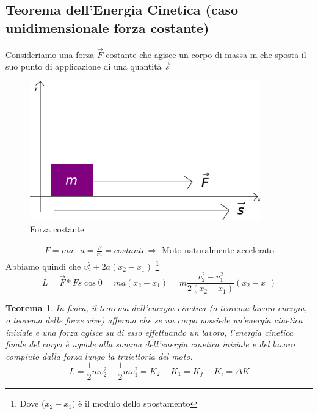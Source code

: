 \documentclass{book}
\newtheorem{teo}{Teorema}
\begin{document}
\subsection{Teorema dell’Energia Cinetica (caso unidimensionale forza costante)}
Consideriamo una forza $\vec{F}$ costante che agisce un corpo di massa m che sposta il suo punto di
applicazione di una quantità $\vec{s}$
\begin{figure}[th]
    \centering
    \includegraphics[width=10cm]{img/finiti/forza_costante.eps}
    \caption{Forza costante}
\end{figure}
\begin{equation}
  \begin{matrix}
    F=ma & a=\frac{F}{m}=costante \Rightarrow \text{ Moto naturalmente accelerato}
  \end{matrix}
\end{equation}
Abbiamo quindi che $v_2^2+2a(x_2-x_1)$ \footnote{Dove ($x_2-x_1$) è il modulo dello spostamento}
\begin{equation}
  L=\vec{F} * Fs \cos 0 = ma (x_2-x_1)=m\frac{v_2^2-v_1^2}{2(x_2-x_1)}(x_2-x_1)
\end{equation}
\begin{teo}
  In fisica, il teorema dell'energia cinetica (o teorema lavoro-energia, o
  teorema delle forze vive) afferma che se un corpo possiede un'energia cinetica iniziale e
  una forza agisce su di esso effettuando un lavoro, l'energia cinetica finale del corpo è
  uguale alla somma dell'energia cinetica iniziale e del lavoro compiuto dalla forza lungo
  la traiettoria del moto.
  \begin{equation}
    L=\frac{1}{2} m v_2^2-\frac{1}{2} m v_1^2=K_2-K_1=K_f-K_i=\Delta K
  \end{equation}
\end{teo}




\end{document}
